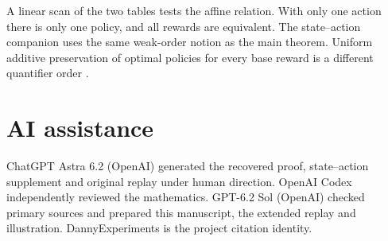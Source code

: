 \documentclass[11pt,a4paper]{amsart}
\begin{document}
A linear scan of the two tables tests the affine relation. With only one action there is only one policy, and all rewards are equivalent. The state--action companion uses the same weak-order notion as the main theorem. Uniform additive preservation of optimal policies for every base reward is a different quantifier order \cite{ng,jenner}.

\section*{AI assistance}
ChatGPT Astra 6.2 (OpenAI) generated the recovered proof, state--action supplement and original replay under human direction. OpenAI Codex independently reviewed the mathematics. GPT-6.2 Sol (OpenAI) checked primary sources and prepared this manuscript, the extended replay and illustration. DannyExperiments is the project citation identity.



\end{document}
